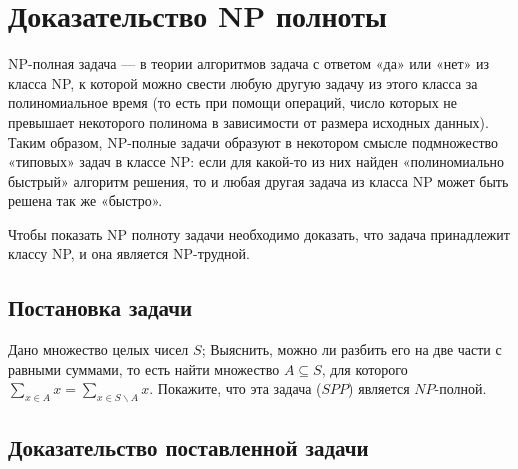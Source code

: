 \documentclass[bachelor, och, labwork]{shiza}
\begin{document}

\tableofcontents

  
  \section{Доказательство NP полноты}

    NP-полная задача — в теории алгоритмов задача с ответом «да» или «нет» из класса NP, к 
  которой можно свести любую другую задачу из этого класса за полиномиальное время (то есть при 
  помощи операций, число которых не превышает некоторого полинома в зависимости от размера 
  исходных данных). Таким образом, NP-полные задачи образуют в некотором смысле подмножество 
  «типовых» задач в классе NP: если для какой-то из них найден «полиномиально быстрый» алгоритм 
  решения, то и любая другая задача из класса NP может быть решена так же «быстро».

  Чтобы показать NP полноту задачи необходимо доказать, что задача принадлежит классу NP, и она является NP-трудной.

  \subsection{Постановка задачи}

  Дано множество целых чисел $S$; Выяснить, можно ли разбить его на две части с равными суммами, то есть найти множество
  $A \subseteq S$, для которого $\sum_{x \in A} x = \sum_{x \in S \backslash A} x$. Покажите, что эта задача ($SPP$) является $NP$-полной.
  
  \subsection{Доказательство поставленной задачи}
\end{document}
